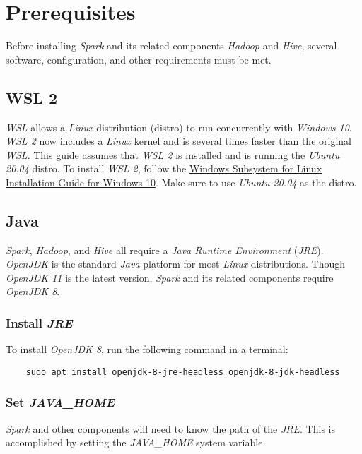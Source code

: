 \documentclass{article}
\begin{document}
\section{Prerequisites}
Before installing \emph{Spark} and its related components \emph{Hadoop} and \emph{Hive}, several
software, configuration, and other requirements must be met.

  \subsection{WSL 2}
  \emph{WSL} allows a \emph{Linux} distribution (distro) to run concurrently with
  \emph{Windows 10}. \emph{WSL 2} now includes a \emph{Linux} kernel and is several times faster
  than the original \emph{WSL}. This guide assumes that \emph{WSL 2} is installed and is running
  the \emph{Ubuntu 20.04} distro. To install \emph{WSL 2}, follow the
  \href{https://docs.microsoft.com/en-us/windows/wsl/install-win10}{Windows Subsystem
  for Linux Installation Guide for Windows 10}. Make sure to use \emph{Ubuntu 20.04} as the distro.

  \subsection{Java}
  \emph{Spark}, \emph{Hadoop}, and \emph{Hive} all require a \emph{Java Runtime Environment}
  (\emph{JRE}). \emph{OpenJDK} is the standard \emph{Java} platform for most \emph{Linux}
  distributions. Though \emph{OpenJDK 11} is the latest version, \emph{Spark} and its related
  components require \emph{OpenJDK 8}.

    \subsubsection{Install \emph{JRE}}
    To install \emph{OpenJDK 8}, run the following command in a terminal:
    \begin{verbatim}
    sudo apt install openjdk-8-jre-headless openjdk-8-jdk-headless  
    \end{verbatim}

    \subsubsection{Set \emph{JAVA\_HOME}}
    \label{subsec:javahome}
    \emph{Spark} and other components will need to know the path of the
    \emph{JRE}. This is accomplished by setting the \emph{JAVA\_HOME}
    system variable.
\end{document}
